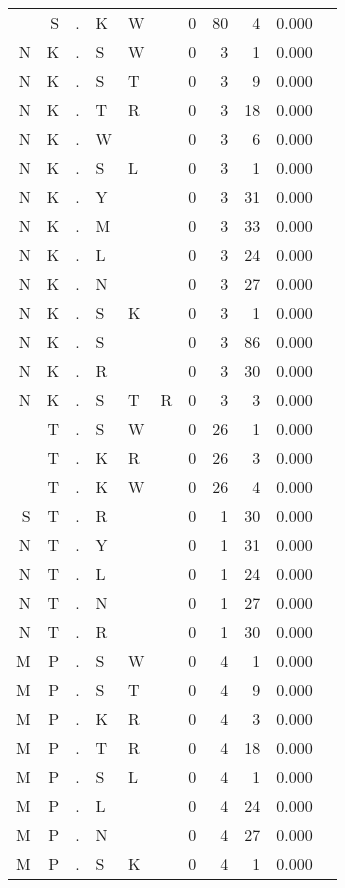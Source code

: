 \begin{longtable}{r@{ } r@{ } c@{ } l@{ } l@{ } l@{ } r r r r l }
  & S & . & K & W &   & 0 & 80 & 4 & 0.000 &  \\
N & K & . & S & W &   & 0 & 3 & 1 & 0.000 &  \\
N & K & . & S & T &   & 0 & 3 & 9 & 0.000 &  \\
N & K & . & T & R &   & 0 & 3 & 18 & 0.000 &  \\
N & K & . & W &   &   & 0 & 3 & 6 & 0.000 &  \\
N & K & . & S & L &   & 0 & 3 & 1 & 0.000 &  \\
N & K & . & Y &   &   & 0 & 3 & 31 & 0.000 &  \\
N & K & . & M &   &   & 0 & 3 & 33 & 0.000 &  \\
N & K & . & L &   &   & 0 & 3 & 24 & 0.000 &  \\
N & K & . & N &   &   & 0 & 3 & 27 & 0.000 &  \\
N & K & . & S & K &   & 0 & 3 & 1 & 0.000 &  \\
N & K & . & S &   &   & 0 & 3 & 86 & 0.000 &  \\
N & K & . & R &   &   & 0 & 3 & 30 & 0.000 &  \\
N & K & . & S & T & R & 0 & 3 & 3 & 0.000 &  \\
  & T & . & S & W &   & 0 & 26 & 1 & 0.000 &  \\
  & T & . & K & R &   & 0 & 26 & 3 & 0.000 &  \\
  & T & . & K & W &   & 0 & 26 & 4 & 0.000 &  \\
S & T & . & R &   &   & 0 & 1 & 30 & 0.000 &  \\
N & T & . & Y &   &   & 0 & 1 & 31 & 0.000 &  \\
N & T & . & L &   &   & 0 & 1 & 24 & 0.000 &  \\
N & T & . & N &   &   & 0 & 1 & 27 & 0.000 &  \\
N & T & . & R &   &   & 0 & 1 & 30 & 0.000 &  \\
M & P & . & S & W &   & 0 & 4 & 1 & 0.000 &  \\
M & P & . & S & T &   & 0 & 4 & 9 & 0.000 &  \\
M & P & . & K & R &   & 0 & 4 & 3 & 0.000 &  \\
M & P & . & T & R &   & 0 & 4 & 18 & 0.000 &  \\
M & P & . & S & L &   & 0 & 4 & 1 & 0.000 &  \\
M & P & . & L &   &   & 0 & 4 & 24 & 0.000 &  \\
M & P & . & N &   &   & 0 & 4 & 27 & 0.000 &  \\
M & P & . & S & K &   & 0 & 4 & 1 & 0.000 &  \\

\end{longtable}
